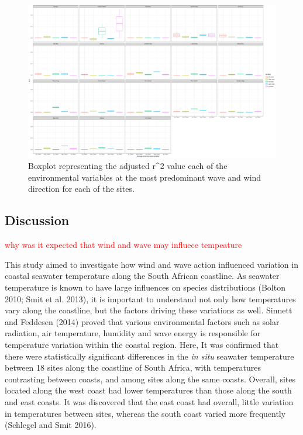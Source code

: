 \documentclass[12pt,A4paper,]{article}
\begin{document}
\begin{figure}
\centering
\includegraphics{../figures/predominant_ww.pdf}
\caption{Boxplot representing the adjusted r\^{}2 value each of the
environmental variables at the most predominant wave and wind direction
for each of the sites.}
\end{figure}

\subsection{Discussion}\label{discussion}

\textcolor{red}{why was it expected that wind and wave may influece tempeature}

This study aimed to investigate how wind and wave action influenced
variation in coastal seawater temperature along the South African
coastline. As seawater temperature is known to have large influences on
species distributions (Bolton 2010; Smit et al. 2013), it is important
to understand not only how temperatures vary along the coastline, but
the factors driving these variations as well. Sinnett and Feddesen
(2014) proved that various environmental factors such as solar
radiation, air temperature, humidity and wave energy is responsible for
temperature variation within the coastal region. Here, It was confirmed
that there were statistically significant differences in the \emph{in
situ} seawater temperature between 18 sites along the coastline of South
Africa, with temperatures contrasting between coasts, and among sites
along the same coasts. Overall, sites located along the west coast had
lower temperatures than those along the south and east coasts. It was
discovered that the east coast had overall, little variation in
temperatures between sites, whereas the south coast varied more
frequently (Schlegel and Smit 2016).
\end{document}
